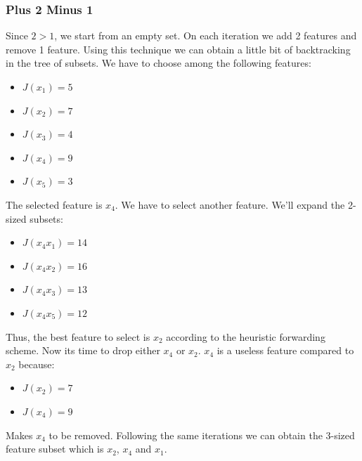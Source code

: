 \documentclass[12pt]{article}
\numberwithin{equation}{section}
\numberwithin{table}{section}
\numberwithin{figure}{section}
\begin{document}
\subsubsection*{Plus 2 Minus 1}
Since $2 > 1$, we start from an empty set. On each iteration we add 2 features and remove 1 feature. Using this technique we can obtain a little bit of backtracking in the tree of subsets. We have to choose among the following features:
\begin{itemize}
	\item $J(x_1) = 5$
	\item $J(x_2) = 7$
	\item $J(x_3) = 4$
	\item $J(x_4) = 9$
	\item $J(x_5) = 3$
\end{itemize}
The selected feature is $x_4$. We have to select another feature. We'll expand the 2-sized subsets:
\begin{itemize}
	\item $J(x_4x_1) = 14$
	\item $J(x_4x_2) = 16$
	\item $J(x_4x_3) = 13$
	\item $J(x_4x_5) = 12$
\end{itemize}
Thus, the best feature to select is $x_2$ according to the heuristic forwarding scheme. Now its time to drop either $x_4$ or $x_2$. $x_4$ is a useless feature compared to $x_2$ because:
\begin{itemize}
	\item $J(x_2) = 7$
	\item $J(x_4) = 9$
\end{itemize} 
Makes $x_4$ to be removed.
Following the same iterations we can obtain the 3-sized feature subset which is $x_2$, $x_4$ and $x_1$.
\end{document}
